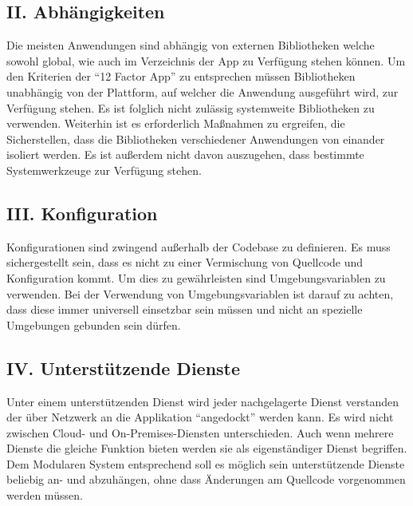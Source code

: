 \documentclass[fleqn,10pt]{SelfArx} %
\begin{document}
\subsection{II. Abhängigkeiten}
Die meisten Anwendungen sind abhängig von externen Bibliotheken welche sowohl global, wie auch im Verzeichnis der App zu Verfügung stehen können. Um den Kriterien der \enquote{12 Factor App} zu entsprechen müssen Bibliotheken unabhängig von der Plattform, auf welcher die Anwendung ausgeführt wird, zur Verfügung stehen. Es ist folglich nicht zulässig systemweite Bibliotheken zu verwenden. Weiterhin ist es erforderlich Maßnahmen zu ergreifen, die Sicherstellen, dass die Bibliotheken verschiedener Anwendungen von einander isoliert werden.\newline
Es ist außerdem nicht davon auszugehen, dass bestimmte Systemwerkzeuge zur Verfügung stehen.
\subsection{III. Konfiguration}
Konfigurationen sind zwingend außerhalb der Codebase zu definieren. Es muss sichergestellt sein, dass es nicht zu einer Vermischung von Quellcode und Konfiguration kommt. Um dies zu gewährleisten sind Umgebungsvariablen zu verwenden. Bei der Verwendung von Umgebungsvariablen ist darauf zu achten, dass diese immer universell einsetzbar sein müssen und nicht an spezielle Umgebungen gebunden sein dürfen.
\subsection{IV. Unterstützende Dienste}
Unter einem unterstützenden Dienst wird jeder nachgelagerte Dienst verstanden der über Netzwerk an die Applikation \enquote{angedockt} werden kann. Es wird nicht zwischen Cloud- und On-Premises-Diensten unterschieden. Auch wenn mehrere Dienste die gleiche Funktion bieten werden sie als eigenständiger Dienst begriffen. Dem Modularen System entsprechend soll es möglich sein unterstützende Dienste beliebig an- und abzuhängen, ohne dass Änderungen am Quellcode vorgenommen werden müssen.
\end{document}

